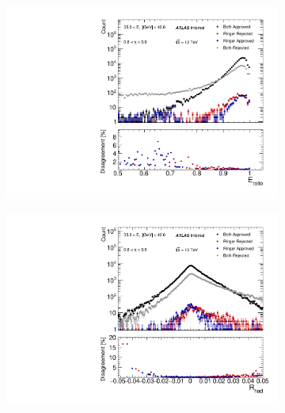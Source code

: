 \begin{figure}[h!]
\begin{subfigure}[c]{.49\textwidth}
\centering
\includegraphics[width=\textwidth]{sections/05_analysis/figures/quadrant_plots/HLT_e28_lhtight_nod0_noringer_ivarloose_HLT_e28_lhtight_nod0_ivarloose_eratio_et4_eta1.pdf}
\caption{}
\end{subfigure}
\hfill
\begin{subfigure}[c]{.49\textwidth}
\centering
\includegraphics[width=\textwidth]{sections/05_analysis/figures/quadrant_plots/HLT_e28_lhtight_nod0_noringer_ivarloose_HLT_e28_lhtight_nod0_ivarloose_rhad_et4_eta1.pdf}
\caption{}
\end{subfigure} \\



\end{figure}
